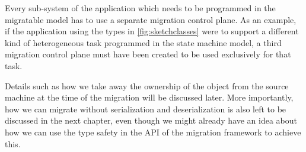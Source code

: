 Every sub-system of the application which needs to be programmed in the
migratable model has to use a separate migration control plane. As an
example, if the application using the types in \autoref{fig:sketchclasses}
were to support a different kind of heterogeneous task programmed in the
state machine model, a third migration control plane must have been created to
be used exclusively for that task.

Details such as how we take away the ownership of the object from the source
machine at the time of the migration will be discussed later.
More importantly, how we can migrate without serialization and deserialization
is also left to be discussed in the next chapter, even though we might
already have an idea about how we can use the type safety in the API of the
migration framework to achieve this.
